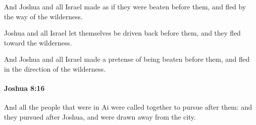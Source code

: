 			\begin{versebox}
					\item[BHS] 
					\item[ASV] And Joshua and all Israel made as if they were beaten before them, and fled by the way of the wilderness.
					\item[NIV] Joshua and all Israel let themselves be driven back before them, and they fled toward the wilderness.
					\item[NRSV] And Joshua and all Israel made a pretense of being beaten before them, and fled in the direction of the wilderness.
			\end{versebox}

		\paragraph{Joshua 8:16} %
			\label{JOSHUA-8-16}

			And all the people that were in Ai were called together to pursue after them: and they pursued after Joshua, and were drawn away from the city.


